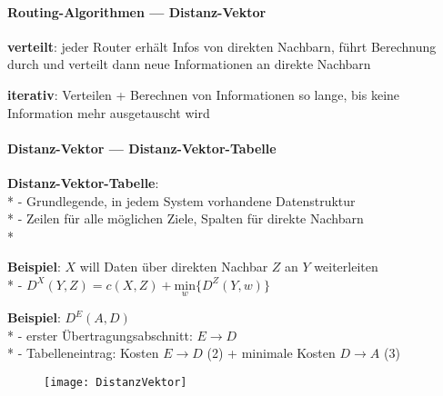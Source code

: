 \paragraph{Routing-Algorithmen --- Distanz-Vektor}
\begin{items}
    \item \textbf{verteilt}: jeder Router erhält Infos von direkten Nachbarn, führt Berechnung durch und verteilt dann neue Informationen an direkte Nachbarn
    \item \textbf{iterativ}: Verteilen + Berechnen von Informationen so lange, bis keine Information mehr ausgetauscht wird

\end{items}

\paragraph{Distanz-Vektor --- Distanz-Vektor-Tabelle}
\begin{items}
	\item \textbf{Distanz-Vektor-Tabelle}: \\*
	- Grundlegende, in jedem System vorhandene Datenstruktur \\*
	- Zeilen für alle möglichen Ziele, Spalten für direkte Nachbarn \\*
  \item \textbf{Beispiel}: \( X \) will Daten über direkten Nachbar \( Z \) an \( Y \) weiterleiten \\*
    - \( D^X(Y,Z) = c(X,Z) + \underset{w}{\text{min}}\{ D^Z(Y,w) \} \)
  \item \textbf{Beispiel}: \( D^E(A,D) \) \\*
    - erster Übertragungsabschnitt: \( E \to D \) \\*
    - Tabelleneintrag: Kosten \( E \to D \) (2) + minimale Kosten \( D \to A \) (3)
\end{items}
\begin{figure}[H]\centering\label{DistanzVektor}\texttt{[image: DistanzVektor]}\end{figure}

